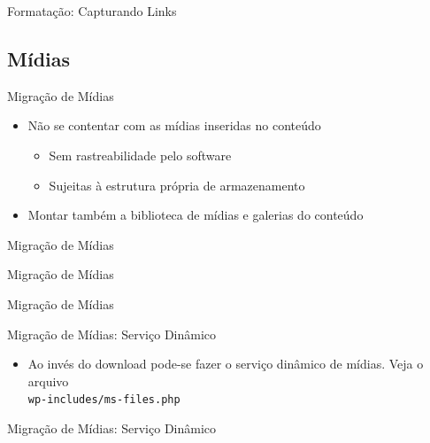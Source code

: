 \documentclass{beamer}
\begin{document}
\begin{frame}{Formatação: Capturando Links}
  
\end{frame}


\subsection{Mídias}

\begin{frame}{Migração de Mídias}
  \begin{itemize}
    \pause \item Não se contentar com as mídias inseridas no conteúdo
    \begin{itemize}
      \pause \item Sem rastreabilidade pelo software
      \pause \item Sujeitas à estrutura própria de armazenamento
    \end{itemize}
    \pause \item Montar também a biblioteca de mídias e galerias do conteúdo
  \end{itemize}
\end{frame}

\begin{frame}{Migração de Mídias}
  
\end{frame}

\begin{frame}{Migração de Mídias}
  
\end{frame}

\begin{frame}{Migração de Mídias}
  
\end{frame}

\begin{frame}{Migração de Mídias: Serviço Dinâmico}
  \begin{itemize}
    \item Ao invés do download pode-se fazer o serviço dinâmico de mídias.
          Veja o arquivo \\
          \texttt{wp-includes/ms-files.php}
  \end{itemize}
\end{frame}

\begin{frame}{Migração de Mídias: Serviço Dinâmico}
  
\end{frame}
\end{document}
